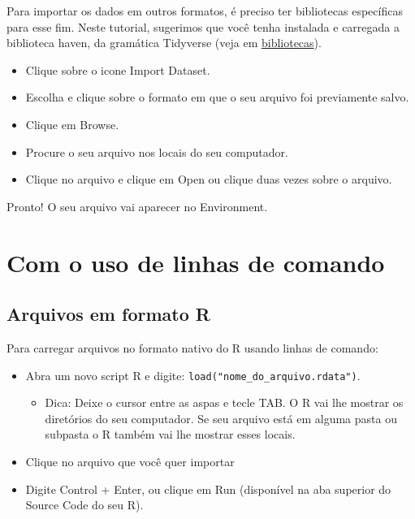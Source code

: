 \documentclass[
  10pt,
  brazil,
  a4paper,
  twoside, notitlepage, openright]{book}
\providecommand{\tightlist}{%
  \setlength{\itemsep}{0pt}\setlength{\parskip}{0pt}}
\begin{document}
Para importar os dados em outros formatos, é preciso ter bibliotecas específicas para esse fim. Neste tutorial, sugerimos que você tenha instalada e carregada a biblioteca haven, da gramática Tidyverse (veja em \protect\hyperlink{biblio}{bibliotecas}).

\begin{itemize}
\tightlist
\item
  Clique sobre o icone Import Dataset.
\item
  Escolha e clique sobre o formato em que o seu arquivo foi previamente salvo.
\item
  Clique em Browse.
\item
  Procure o seu arquivo nos locais do seu computador.
\item
  Clique no arquivo e clique em Open ou clique duas vezes sobre o arquivo.
\end{itemize}

Pronto! O seu arquivo vai aparecer no Environment.

\hypertarget{com-o-uso-de-linhas-de-comando}{%
\section{Com o uso de linhas de comando}\label{com-o-uso-de-linhas-de-comando}}

\hypertarget{arquivos-em-formato-r-1}{%
\subsection{Arquivos em formato R}\label{arquivos-em-formato-r-1}}

Para carregar arquivos no formato nativo do R usando linhas de comando:

\begin{itemize}
\tightlist
\item
  Abra um novo script R e digite: \texttt{load("nome\_do\_arquivo.rdata")}.

  \begin{itemize}
  \tightlist
  \item
    Dica: Deixe o cursor entre as aspas e tecle TAB. O R vai lhe mostrar os diretórios do seu computador. Se seu arquivo está em alguma pasta ou subpasta o R também vai lhe mostrar esses locais.\\
  \end{itemize}
\item
  Clique no arquivo que você quer importar\\
\item
  Digite Control + Enter, ou clique em Run (disponível na aba superior do Source Code do seu R).
\end{itemize}
\end{document}
